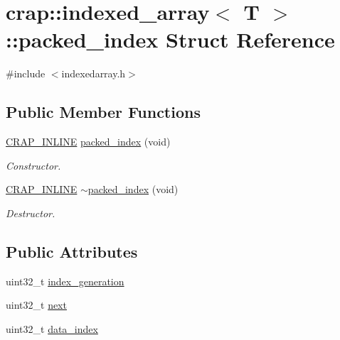 \hypertarget{structcrap_1_1indexed__array_1_1packed__index}{}\section{crap\+:\+:indexed\+\_\+array$<$ T $>$\+:\+:packed\+\_\+index Struct Reference}
\label{structcrap_1_1indexed__array_1_1packed__index}


{\ttfamily \#include $<$indexedarray.\+h$>$}

\subsection*{Public Member Functions}
\begin{DoxyCompactItemize}
\item 
\hyperlink{config__x86_8h_a5a40526b8d842e7ff731509998bb0f1c}{C\+R\+A\+P\+\_\+\+I\+N\+L\+I\+N\+E} \hyperlink{structcrap_1_1indexed__array_1_1packed__index_aad0faf66ec3327d5bf42f67928f66fcd}{packed\+\_\+index} (void)
\begin{DoxyCompactList}\small\item\em Constructor. \end{DoxyCompactList}\item 
\hyperlink{config__x86_8h_a5a40526b8d842e7ff731509998bb0f1c}{C\+R\+A\+P\+\_\+\+I\+N\+L\+I\+N\+E} \hyperlink{structcrap_1_1indexed__array_1_1packed__index_af40be03923d226ed3f78a57dbc2cb831}{$\sim$packed\+\_\+index} (void)
\begin{DoxyCompactList}\small\item\em Destructor. \end{DoxyCompactList}\end{DoxyCompactItemize}
\subsection*{Public Attributes}
\begin{DoxyCompactItemize}
\item 
uint32\+\_\+t \hyperlink{structcrap_1_1indexed__array_1_1packed__index_af5423207ebc6a3cbf46e5689d840e2af}{index\+\_\+generation}
\item 
uint32\+\_\+t \hyperlink{structcrap_1_1indexed__array_1_1packed__index_a790171618ecc2fe9aa6b1b7526c43201}{next}
\item 
uint32\+\_\+t \hyperlink{structcrap_1_1indexed__array_1_1packed__index_a743ddc52af6d873167476bbca9fc23a8}{data\+\_\+index}
\end{DoxyCompactItemize}


